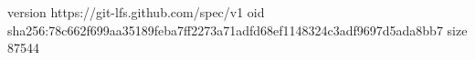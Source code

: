 version https://git-lfs.github.com/spec/v1
oid sha256:78c662f699aa35189feba7ff2273a71adfd68ef1148324c3adf9697d5ada8bb7
size 87544
